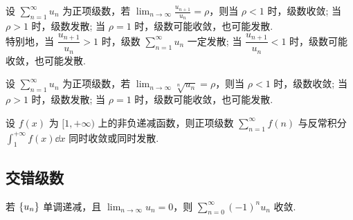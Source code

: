 \begin{theorem}[比值审敛法]
    设 $\displaystyle  \sum_{n=1}^{\infty} u_{n} $ 为正项级数，若 $\displaystyle  \lim _{n \rightarrow \infty} \frac{u_{n+1}}{u_{n}}=\rho $，则当 $ \rho<1 $ 时，级数收敛; 
    当 $ \rho>1 $ 时，级数发散; 当 $ \rho=1 $ 时，级数可能收敛，也可能发散.\\
    特别地，当 $ \dfrac{u_{n+1}}{u_{n}}>1 $ 时，级数 $\displaystyle  \sum_{n=1}^{\infty} u_{n} $ 一定发散; 当 $ \dfrac{u_{n+1}}{u_{n}}<1 $ 时，级数可能收敛，也可能发散.
\end{theorem}

\begin{theorem}[根值审敛法]
    设 $\displaystyle \sum_{n=1}^{\infty} u_{n} $ 为正项级数，若 $\displaystyle \lim _{n \rightarrow \infty} \sqrt[n]{u_{n}}=\rho $，则当 $ \rho<1 $ 时，级数收敛; 
    当 $ \rho>1 $ 时，级数发散; 当 $ \rho=1 $ 时，级数可能收敛，也可能发散.
\end{theorem}

\begin{theorem}[积分判别法]
    设 $ f(x) $ 为 $ [1,+\infty) $ 上的非负递减函数，则正项级数 $\displaystyle  \sum_{n=1}^{\infty} f(n) $ 与反常积分 $\displaystyle \int_{1}^{+\infty} f(x) \dd x $ 同时收敛或同时发散.
\end{theorem}

\subsection{交错级数}

\begin{theorem}[Leibniz 定理]
    若 $\qty{u_n}$ 单调递减，且 $\displaystyle\lim_{n\to\infty}u_n=0$，则 $\displaystyle\sum_{n=0}^{\infty}(-1)^nu_n$ 收敛.
\end{theorem}

